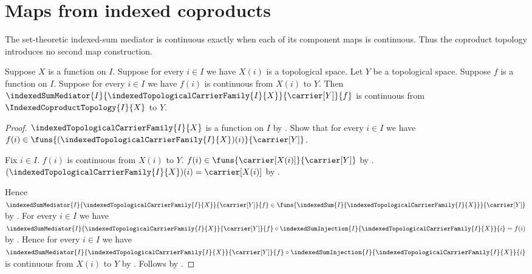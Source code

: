 \section{Maps from indexed coproducts}



The set-theoretic indexed-sum mediator is continuous exactly when each of
its component maps is continuous.  Thus the coproduct topology introduces no
second map construction.

\begin{theorem}\label{continuous_indexed_coproduct_mediator}
    Suppose $X$ is a function on $I$.
    Suppose for every $i\in I$ we have $X(i)$ is a topological space.
    Let $Y$ be a topological space.
    Suppose $f$ is a function on $I$.
    Suppose for every $i\in I$ we have
        $f(i)$ is continuous from $X(i)$ to $Y$.
    Then $\indexedSumMediator{I}{
        \indexedTopologicalCarrierFamily{I}{X}}{\carrier[Y]}{f}$
        is continuous from $\IndexedCoproductTopology{I}{X}$ to $Y$.
\end{theorem}
\begin{proof}
    $\indexedTopologicalCarrierFamily{I}{X}$ is a function on $I$ by
        .
    Show that for every $i\in I$ we have
        $f(i)\in\funs{
            (\indexedTopologicalCarrierFamily{I}{X})(i)}{\carrier[Y]}$.
    \begin{subproof}
        Fix $i\in I$.
        $f(i)$ is continuous from $X(i)$ to $Y$.
        $f(i)\in\funs{\carrier[X(i)]}{\carrier[Y]}$ by
            .
        $(\indexedTopologicalCarrierFamily{I}{X})(i)
            =\carrier[X(i)]$ by
            .
    \end{subproof}
    Hence $\indexedSumMediator{I}{
        \indexedTopologicalCarrierFamily{I}{X}}{\carrier[Y]}{f}
        \in\funs{
            \indexedSum{I}{
                \indexedTopologicalCarrierFamily{I}{X}}}{\carrier[Y]}$ by
        .
    For every $i\in I$ we have
        $\indexedSumMediator{I}{
            \indexedTopologicalCarrierFamily{I}{X}}{\carrier[Y]}{f}
        \circ\indexedSumInjection{I}{
            \indexedTopologicalCarrierFamily{I}{X}}{i}=f(i)$ by
        .
    Hence for every $i\in I$ we have
        $\indexedSumMediator{I}{
            \indexedTopologicalCarrierFamily{I}{X}}{\carrier[Y]}{f}
        \circ\indexedSumInjection{I}{
            \indexedTopologicalCarrierFamily{I}{X}}{i}$
        is continuous from $X(i)$ to $Y$ by \auto.
    Follows by .
\end{proof}

